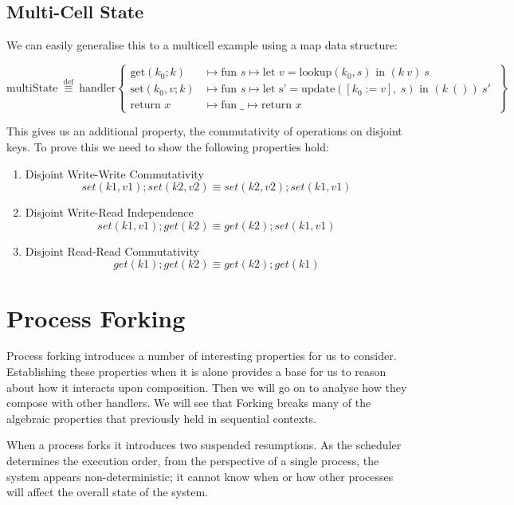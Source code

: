 \documentclass[logo,bsc,singlespacing,parskip]{infthesis}
\begin{document}
\subsection{Multi-Cell State}
We can easily generalise this to a multicell example using a map data structure: 

\[
\text{multiState} \ \overset{\text{def}}{\equiv} \ \text{handler} \left\{
\begin{array}{ll}
\text{get}(k_0; k) &\mapsto \text{fun } s \mapsto \text{let } v = \text{lookup}(k_0, s) \text{ in } (k\ v)\ s \\
\text{set}(k_0, v; k) &\mapsto \text{fun } s \mapsto \text{let s'} = \text{update}([k_0 := v],\ s) \text{ in } (k\ ())\ s'\ \\
\text{return } x &\mapsto \text{fun } \_ \mapsto \text{return } x
\end{array}
\right\}
\]

This gives us an additional property, the commutativity of operations on disjoint keys. To prove this we need to show the following properties hold:
\begin{enumerate}
    \item Disjoint Write-Write Commutativity
    \[set(k1,v1);set(k2,v2) \equiv set(k2,v2);set(k1,v1)\] 
    \item Disjoint Write-Read Independence
        \[set(k1,v1);get(k2) \equiv get(k2);set(k1,v1)\] 

    \item Disjoint Read-Read Commutativity
        \[get(k1);get(k2) \equiv get(k2);get(k1)\] 

\end{enumerate}



\section{Process Forking}
Process forking introduces a number of interesting properties for us to consider. Establishing these properties when it is alone provides a base for us to reason about how it interacts upon composition. Then we will go on to analyse how they compose with other handlers. We will see that Forking breaks many of the algebraic properties that previously held in sequential contexts.

When a process forks it introduces two suspended resumptions. As the scheduler determines the execution order, from the perspective of a single process, the system appears non-deterministic; it cannot know when or how other processes will affect the overall state of the system.
\end{document}
